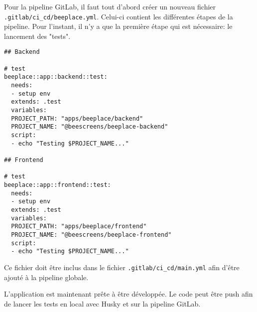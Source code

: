 Pour la pipeline GitLab, il faut tout d'abord créer un nouveau fichier \texttt{.gitlab/ci_cd/beeplace.yml}. Celui-ci contient les différentes étapes de la pipeline. Pour l'instant, il n'y a que la première étape qui est nécessaire: le lancement des "tests".

\begin{verbatim}
## Backend

# test
beeplace::app::backend::test:
  needs:
  - setup env
  extends: .test
  variables:
  PROJECT_PATH: "apps/beeplace/backend"
  PROJECT_NAME: "@beescreens/beeplace-backend"
  script:
  - echo "Testing $PROJECT_NAME..."

## Frontend

# test
beeplace::app::frontend::test:
  needs:
  - setup env
  extends: .test
  variables:
  PROJECT_PATH: "apps/beeplace/frontend"
  PROJECT_NAME: "@beescreens/beeplace-frontend"
  script:
  - echo "Testing $PROJECT_NAME..."
\end{verbatim}

Ce fichier doit être inclus dans le fichier \texttt{.gitlab/ci_cd/main.yml} afin d'être ajouté à la pipeline globale.

L'application est maintenant prête à être développée. Le code peut être push afin de lancer les tests en local avec Husky et sur la pipeline GitLab.